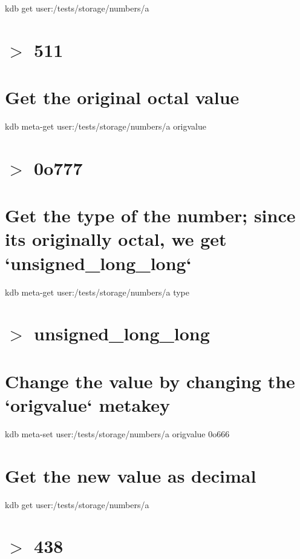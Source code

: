 kdb get \textquotesingle{}user\+:/tests/storage/numbers/a\textquotesingle{} \hypertarget{autotoc_md642_autotoc_md678}{}\section{$>$ 511}\label{autotoc_md642_autotoc_md678}
\hypertarget{autotoc_md642_autotoc_md679}{}\section{Get the original octal value}\label{autotoc_md642_autotoc_md679}
kdb meta-\/get \textquotesingle{}user\+:/tests/storage/numbers/a\textquotesingle{} \textquotesingle{}origvalue\textquotesingle{} \hypertarget{autotoc_md642_autotoc_md680}{}\section{$>$ 0o777}\label{autotoc_md642_autotoc_md680}
\hypertarget{autotoc_md642_autotoc_md681}{}\section{Get the type of the number; since it\textquotesingle{}s originally octal, we get `unsigned\+\_\+long\+\_\+long`}\label{autotoc_md642_autotoc_md681}
kdb meta-\/get \textquotesingle{}user\+:/tests/storage/numbers/a\textquotesingle{} \textquotesingle{}type\textquotesingle{} \hypertarget{autotoc_md642_autotoc_md682}{}\section{$>$ unsigned\+\_\+long\+\_\+long}\label{autotoc_md642_autotoc_md682}
\hypertarget{autotoc_md642_autotoc_md683}{}\section{Change the value by changing the `origvalue` metakey}\label{autotoc_md642_autotoc_md683}
kdb meta-\/set \textquotesingle{}user\+:/tests/storage/numbers/a\textquotesingle{} \textquotesingle{}origvalue\textquotesingle{} \textquotesingle{}0o666\textquotesingle{}\hypertarget{autotoc_md642_autotoc_md684}{}\section{Get the new value as decimal}\label{autotoc_md642_autotoc_md684}
kdb get \textquotesingle{}user\+:/tests/storage/numbers/a\textquotesingle{} \hypertarget{autotoc_md642_autotoc_md685}{}\section{$>$ 438}\label{autotoc_md642_autotoc_md685}
